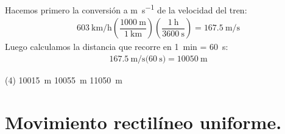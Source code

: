 \documentclass[12pt, letter]{exam}
\begin{document}
\begin{questions}
    \vspace*{0.5cm}
    Hacemos primero la conversión a \unit{\meter\per\second} de la velocidad del tren:
    \begin{align*}
        \SI[per-mode=fraction]{603}{\kilo\meter\per\hour} \left( \dfrac{\SI{1000}{\meter}}{\SI{1}{\kilo\meter}} \right) \left( \dfrac{\SI{1}{\hour}}{\SI{3600}{\second}} \right) = \SI[per-mode=fraction]{167.5}{\meter\per\second}
    \end{align*}
    Luego calculamos la distancia que recorre en \SI{1}{\minute} = \SI{60}{\second}:
    \begin{align*}
        \SI[per-mode=fraction]{167.5}{\meter\per\second} \bigg( \SI{60}{\second} \bigg) = \SI{10050}{\meter}
    \end{align*}
    \begin{tasks}(4)
        \task \SI{10015}{\meter}
        \task {}
        \task \SI{10055}{\meter}
        \task \SI{11050}{\meter}
    \end{tasks}

    \section{Movimiento rectilíneo uniforme.}

    

\end{questions}
\end{document}
